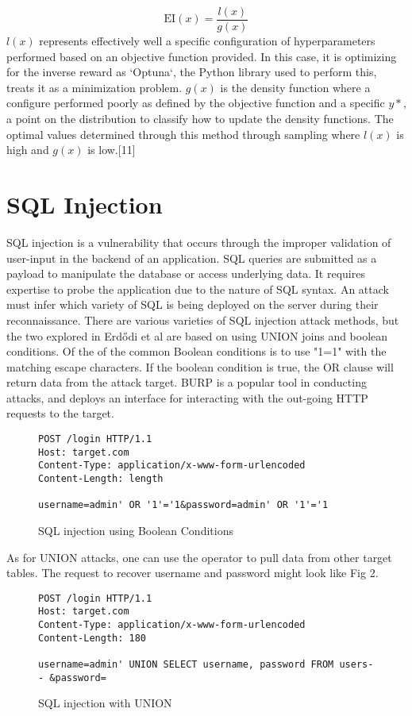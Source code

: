 \documentclass[conference]{IEEEtran}
\begin{document}
\[
\text{EI}(x) = \frac{l(x)}{g(x)}
\]
$l(x)$ represents effectively well a specific configuration of hyperparameters performed based on an objective function provided. In this case, it is optimizing for the inverse reward  as `Optuna`, the Python library used to perform this, treats it as a minimization problem. $g(x)$ is the density function where a configure performed poorly as defined by the objective function and a specific $y*$, a point on the distribution to classify how to update the density functions. The optimal values determined through this method through sampling where $l(x)$ is high and $g(x)$ is low.[11]

\section{SQL Injection}
SQL injection is a vulnerability that occurs through the improper validation of user-input in the backend of an application. SQL queries are submitted as a payload to manipulate the database or access underlying data. It requires expertise to probe the application due to the nature of SQL syntax. An attack must infer which variety of SQL is being deployed on the server during their reconnaissance. There are various varieties of SQL injection attack methods, but the two explored in Erdődi et al are based on using UNION joins and boolean conditions. Of the of the common Boolean conditions is to use "1=1" with the matching escape characters. If the boolean condition is true, the OR clause will return data from the attack target. BURP is a popular tool in conducting attacks, and deploys an interface for interacting with the out-going HTTP requests to the target.

\begin{figure}[ht]
\begin{lstlisting}
POST /login HTTP/1.1
Host: target.com
Content-Type: application/x-www-form-urlencoded
Content-Length: length

username=admin' OR '1'='1&password=admin' OR '1'='1

\end{lstlisting}
\caption{SQL injection using Boolean Conditions}
\label{fig:booleanrequest}
\end{figure}

As for UNION attacks, one can use the operator to pull data from other target tables. The request to recover username and password might look like Fig 2. 

\begin{figure}[ht]
\begin{lstlisting}
POST /login HTTP/1.1
Host: target.com
Content-Type: application/x-www-form-urlencoded
Content-Length: 180

username=admin' UNION SELECT username, password FROM users-- &password=

\end{lstlisting}
\caption{SQL injection with UNION}
\label{fig:unionrequest}
\end{figure}
\end{document}
